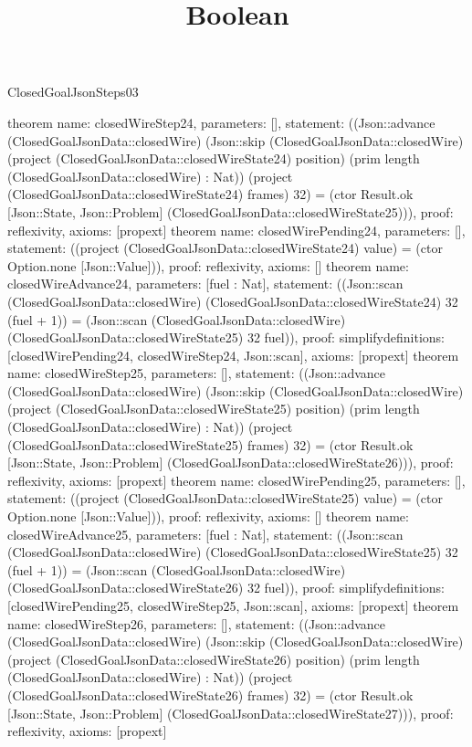 \begin{lexlean}{ClosedGoalJsonSteps03}
\title{Boolean}
\begin{semanticmodule}
theorem{
 name: closedWireStep24, parameters: [],
 statement: ((Json::advance (ClosedGoalJsonData::closedWire) (Json::skip (ClosedGoalJsonData::closedWire) (project (ClosedGoalJsonData::closedWireState24) position) (prim length (ClosedGoalJsonData::closedWire) : Nat)) (project (ClosedGoalJsonData::closedWireState24) frames) 32) = (ctor Result.ok [Json::State, Json::Problem] (ClosedGoalJsonData::closedWireState25))), proof: reflexivity{}, axioms: [propext]
}
theorem{
 name: closedWirePending24, parameters: [],
 statement: ((project (ClosedGoalJsonData::closedWireState24) value) = (ctor Option.none [Json::Value])), proof: reflexivity{}, axioms: []
}
theorem{
 name: closedWireAdvance24, parameters: [fuel : Nat],
 statement: ((Json::scan (ClosedGoalJsonData::closedWire) (ClosedGoalJsonData::closedWireState24) 32 (fuel + 1)) = (Json::scan (ClosedGoalJsonData::closedWire) (ClosedGoalJsonData::closedWireState25) 32 fuel)), proof: simplify{definitions: [closedWirePending24, closedWireStep24, Json::scan]}, axioms: [propext]
}
theorem{
 name: closedWireStep25, parameters: [],
 statement: ((Json::advance (ClosedGoalJsonData::closedWire) (Json::skip (ClosedGoalJsonData::closedWire) (project (ClosedGoalJsonData::closedWireState25) position) (prim length (ClosedGoalJsonData::closedWire) : Nat)) (project (ClosedGoalJsonData::closedWireState25) frames) 32) = (ctor Result.ok [Json::State, Json::Problem] (ClosedGoalJsonData::closedWireState26))), proof: reflexivity{}, axioms: [propext]
}
theorem{
 name: closedWirePending25, parameters: [],
 statement: ((project (ClosedGoalJsonData::closedWireState25) value) = (ctor Option.none [Json::Value])), proof: reflexivity{}, axioms: []
}
theorem{
 name: closedWireAdvance25, parameters: [fuel : Nat],
 statement: ((Json::scan (ClosedGoalJsonData::closedWire) (ClosedGoalJsonData::closedWireState25) 32 (fuel + 1)) = (Json::scan (ClosedGoalJsonData::closedWire) (ClosedGoalJsonData::closedWireState26) 32 fuel)), proof: simplify{definitions: [closedWirePending25, closedWireStep25, Json::scan]}, axioms: [propext]
}
theorem{
 name: closedWireStep26, parameters: [],
 statement: ((Json::advance (ClosedGoalJsonData::closedWire) (Json::skip (ClosedGoalJsonData::closedWire) (project (ClosedGoalJsonData::closedWireState26) position) (prim length (ClosedGoalJsonData::closedWire) : Nat)) (project (ClosedGoalJsonData::closedWireState26) frames) 32) = (ctor Result.ok [Json::State, Json::Problem] (ClosedGoalJsonData::closedWireState27))), proof: reflexivity{}, axioms: [propext]
}
\end{semanticmodule}
\end{lexlean}
